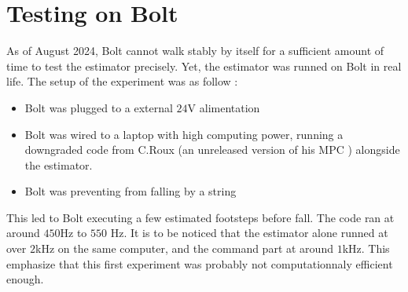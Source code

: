 \documentclass[a4paper,10pt]{article}
\begin{document}
\section{Testing on Bolt}
As of August 2024, Bolt cannot walk stably by itself for a sufficient amount of time to test the estimator precisely. Yet, the estimator was runned on Bolt in real life. The setup of the experiment was as follow : 
\begin{itemize}[noitemsep,topsep=0.5pt,parsep=0.1pt,partopsep=0.1pt]
  \item Bolt was plugged to a external $24$V alimentation
  \item Bolt was wired to a laptop with high computing power, running a downgraded code from C.Roux \cite{Git_CRoux} (an unreleased version of his MPC \cite{Daneshmand_2015}) alongside the estimator.
  \item Bolt was preventing from falling by a string
\end{itemize}
This led to Bolt executing a few estimated footsteps before fall. The code ran at around $450$Hz to $550$ Hz. It is to be noticed that the estimator alone runned at over $2$kHz on the same computer, and the command part at around $1$kHz. This emphasize that this first experiment was probably not computationnaly efficient enough.
\end{document}
